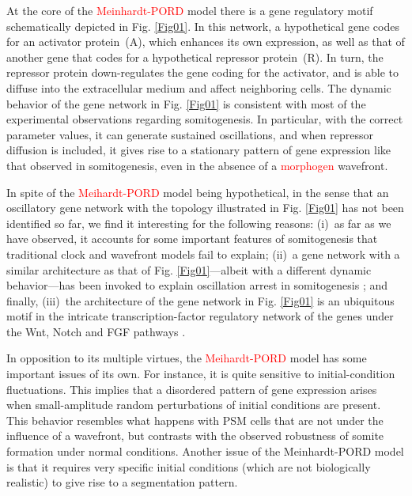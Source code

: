 \documentclass[%
 preprint,
 aip, 
 amsmath,amssymb,
]{revtex4-2}
\begin{document}
At the core of the \textcolor{red}{Meinhardt-PORD} model there is a gene regulatory motif schematically depicted in Fig. \ref{Fig01}. In this network, a hypothetical gene codes for an activator protein~(A), which enhances its own expression, as well as that of another gene that codes for a hypothetical repressor protein~(R). In turn, the repressor protein down-regulates the gene coding for the activator, and is able to diffuse into the extracellular medium and affect neighboring cells. The dynamic behavior of the gene network in Fig. \ref{Fig01} is consistent with most of the experimental observations regarding somitogenesis. In particular, with the correct parameter values, it can generate sustained oscillations, and when repressor diffusion is included, it gives rise to a stationary pattern of gene expression like that observed in somitogenesis, even in the absence of a \textcolor{red}{morphogen} wavefront.
	
In spite of the \textcolor{red}{Meihardt-PORD} model being hypothetical, in the sense that an oscillatory gene network with the topology illustrated in Fig. \ref{Fig01} has not been identified so far, we find it interesting for the following reasons: (i)~as far as we have observed, it accounts for some important features of somitogenesis that traditional clock and wavefront models fail to explain; (ii)~a gene network with a similar architecture as that of Fig. \ref{Fig01}---albeit with a different dynamic behavior---has been invoked to explain oscillation arrest in somitogenesis \cite{Santillan2008, Zavala2012}; and finally, (iii)~the architecture of the gene network in Fig. \ref{Fig01} is an ubiquitous motif in the intricate transcription-factor regulatory network of the genes under the Wnt, Notch and FGF pathways \cite{Gibb2010, Zavala2012}.
	
In opposition to its multiple virtues, the \textcolor{red}{Meihardt-PORD} model has some important issues of its own. For instance, it is quite sensitive to initial-condition fluctuations. This implies that a disordered pattern of gene expression arises when small-amplitude random perturbations of initial conditions are present. This behavior resembles what happens with PSM cells that are not under the influence of a wavefront, but contrasts with the observed robustness of somite formation under normal conditions. Another issue of the Meinhardt-PORD model is that it requires very specific initial conditions (which are not biologically realistic) to give rise to a segmentation pattern. 
\end{document}
